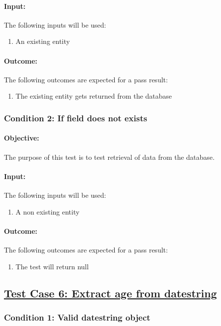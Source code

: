 \documentclass{article}
\begin{document}
\paragraph{Input:} The following inputs will be used:
\begin{enumerate}
	\item An existing entity
\end{enumerate}
\paragraph{Outcome:} The following outcomes are expected for a pass result:
\begin{enumerate}
	\item The existing entity gets returned from the database
\end{enumerate}
\subsubsection{Condition 2: If field does not exists }
\paragraph{Objective:} The purpose of this test is to test retrieval of data from the database.
\paragraph{Input:} The following inputs will be used:
\begin{enumerate}
	\item A non existing entity 
\end{enumerate}
\paragraph{Outcome:} The following outcomes are expected for a pass result:
\begin{enumerate}
	\item The test will return null
\end{enumerate}

\subsection{\underline{Test Case 6: Extract age from datestring}}\label{test6}
\subsubsection{Condition 1: Valid datestring object }
\end{document}
